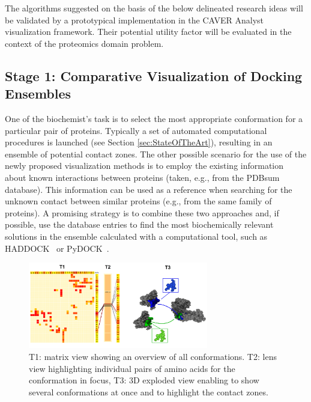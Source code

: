 \documentclass[11pt,a4paper,titlepage,oneside,onecolumn]{article}
\begin{document}
The algorithms suggested on the basis of the below delineated research ideas will be validated by a prototypical implementation in the CAVER Analyst visualization framework. 
Their potential utility factor will be evaluated in the context of the proteomics domain problem. 


\subsection{Stage 1: Comparative Visualization of Docking Ensembles}
One of the biochemist's task is to select the most appropriate conformation for a particular pair of proteins.
Typically a set of automated computational procedures is launched (see Section \ref{sec:StateOfTheArt}), resulting in an ensemble of potential contact zones.
The other possible scenario for the use of the newly proposed visualization methods is to employ the existing information about known interactions between proteins (taken, e.g., from the PDBsum database).
This information can be used as a reference when searching for the unknown contact between similar proteins (e.g., from the same family of proteins). 
A promising strategy is to combine these two approaches and, if possible, use the database entries to find the most biochemically relevant solutions in the ensemble calculated with a computational tool, such as HADDOCK~\cite{haddock} or PyDOCK~\cite{pydock}.

\setlength\intextsep{0pt}
\begin{figure}
\vspace{-5mm}
  \begin{center}
\includegraphics[width=0.7\textwidth]{pics/matrix2.png}
\end{center}
\vspace{-5mm}
\caption{T1: matrix view showing an overview of all conformations. T2: lens view highlighting individual pairs of amino acids for the conformation in focus, T3: 3D exploded view enabling to show several conformations at once and to highlight the contact zones.}
\label{fig:matrix}
\end{figure}
\end{document}
